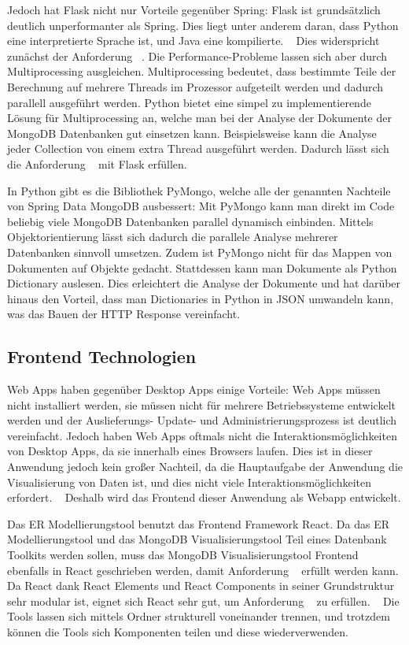 Jedoch hat Flask nicht nur Vorteile gegenüber Spring:
Flask ist grundsätzlich deutlich unperformanter als Spring.
Dies liegt unter anderem daran, dass Python eine interpretierte Sprache ist, und Java eine kompilierte.
~\autocite{sverker:rest_comparison}
Dies widerspricht zunächst der Anforderung ~.
Die Performance-Probleme lassen sich aber durch Multiprocessing ausgleichen.
Multiprocessing bedeutet, dass bestimmte Teile der Berechnung auf mehrere Threads im Prozessor aufgeteilt werden und dadurch parallell ausgeführt werden.
Python bietet eine simpel zu implementierende Lösung für Multiprocessing an, welche man bei der Analyse der Dokumente der MongoDB Datenbanken gut einsetzen kann.
Beispielsweise kann die Analyse jeder Collection von einem extra Thread ausgeführt werden.
Dadurch lässt sich die Anforderung ~ mit Flask erfüllen.

In Python gibt es die Bibliothek PyMongo, welche alle der genannten Nachteile von Spring Data MongoDB ausbessert:
Mit PyMongo kann man direkt im Code beliebig viele MongoDB Datenbanken parallel dynamisch einbinden.
Mittels Objektorientierung lässt sich dadurch die parallele Analyse mehrerer Datenbanken sinnvoll umsetzen.
Zudem ist PyMongo nicht für das Mappen von Dokumenten auf Objekte gedacht.
Stattdessen kann man Dokumente als Python Dictionary auslesen.
Dies erleichtert die Analyse der Dokumente und hat darüber hinaus den Vorteil, dass man Dictionaries in Python in JSON umwandeln kann, was das Bauen der HTTP Response vereinfacht.
~\autocite{mongodb:pymongo}

\subsection{Frontend Technologien}
\label{sec:verwendete_technologien_frontend}

Web Apps haben gegenüber Desktop Apps einige Vorteile:
Web Apps müssen nicht installiert werden, sie müssen nicht für mehrere Betriebssysteme entwickelt werden und der Auslieferungs- Update- und Administrierungsprozess ist deutlich vereinfacht.
Jedoch haben Web Apps oftmals nicht die Interaktionsmöglichkeiten von Desktop Apps, da sie innerhalb eines Browsers laufen.
Dies ist in dieser Anwendung jedoch kein großer Nachteil, da die Hauptaufgabe der Anwendung die Visualisierung von Daten ist, und dies nicht viele Interaktionsmöglichkeiten erfordert.
~\autocite{zepeda2007desktop}
Deshalb wird das Frontend dieser Anwendung als Webapp entwickelt.

Das ER Modellierungstool benutzt das Frontend Framework React.
Da das ER Modellierungstool und das MongoDB Visualisierungstool Teil eines Datenbank Toolkits werden sollen, muss das MongoDB Visualisierungstool Frontend ebenfalls in React geschrieben werden, damit Anforderung ~ erfüllt werden kann.
Da React dank React Elements und React Components in seiner Grundstruktur  sehr modular ist, eignet sich React sehr gut, um Anforderung ~ zu erfüllen.
~\autocite{banks:react}
Die Tools lassen sich mittels Ordner strukturell voneinander trennen, und trotzdem können die Tools sich Komponenten teilen und diese wiederverwenden.

